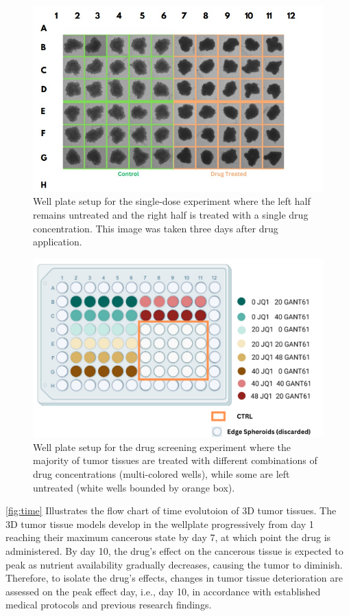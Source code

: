 \begin{figure}[H]
  \centering
  \includegraphics[width=0.9\linewidth]{figures/singledose.png} %
  \caption{Well plate setup for the single-dose experiment where the left half remains untreated and the right half is treated with a single drug 
  concentration. This image was taken three days after drug application.}
  \label{fig:Single dose wellplate}
\end{figure}

\begin{figure}[H]
  \centering
  \includegraphics[width=1\linewidth]{figures/drug_screened.png} %
  \caption{Well plate setup for the drug screening experiment where the majority of tumor tissues are treated with different combinations of drug 
  concentrations (multi-colored wells), while some are left untreated (white wells bounded by orange box).}
  \label{fig:Drug screen wellplate}
\end{figure}

\ref{fig:time} Illustrates the flow chart of time evolutoion of 3D tumor tissues.
The 3D tumor tissue models develop in the wellplate progressively from day 1 reaching their maximum cancerous state by day 7, at which point the drug is 
administered. By day 10, the drug's effect on the cancerous tissue is expected to peak as nutrient availability gradually decreases, causing the tumor to 
diminish. Therefore, to isolate the drug's effects, changes in tumor tissue deterioration are assessed on the peak effect day, i.e., day 10, in 
accordance with established medical protocols and previous research findings.

